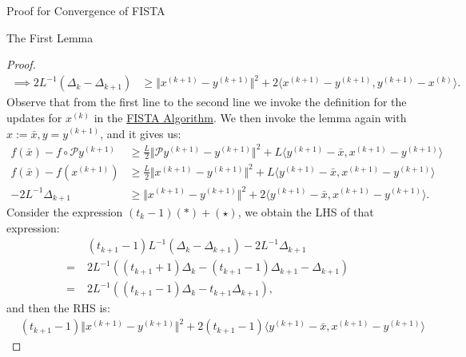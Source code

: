\documentclass[]{article}
\theoremstyle{definition}
\begin{document}
\begin{section}{Proof for Convergence of FISTA}
\begin{subsection}{The First Lemma}
\begin{proof}
\begin{align*}
                \implies
                2L^{-1} (\Delta_k - \Delta_{k + 1}) 
                & \ge 
                \Vert x^{(k + 1)} - y^{(k + 1)}\Vert^2 + 
                2\langle x^{(k + 1)} - y^{(k + 1)}, y^{(k + 1)} - x^{(k)}\rangle. 
                \tag{$*$}
            \end{align*}
            Observe that from the first line to the second line we invoke the definition for the updates for $x^{(k)}$ in the \hyperref[alg:fista_1]{FISTA Algorithm}. We then invoke the lemma again with $x:= \bar x, y = y^{(k + 1)}$, and it gives us: 
            \begin{align*}
                f(\bar x) - f\circ \mathcal P y^{(k + 1)}
                & \ge 
                \frac{L}{2}\Vert \mathcal P y^{(k + 1)} - y^{(k + 1)}\Vert^2 
                + L 
                \langle y^{(k + 1)} - \bar x, x^{(k + 1)} - y^{(k + 1)}\rangle
                \\
                f(\bar x) - f(x^{(k + 1)}) 
                &\ge 
                \frac{L}{2}\Vert x^{(k + 1)} - y^{(k + 1)}\Vert^2
                + 
                L \langle y^{(k + 1)} - \bar x, x^{(k + 1)} - y^{(k + 1)}\rangle
                \\
                -2L^{-1}\Delta_{k + 1}
                & \ge
                \Vert x^{(k + 1)} - y^{(k + 1)}\Vert^2
                + 
                2\langle y^{(k + 1)} - \bar x, x^{(k + 1)} - y^{(k + 1)}\rangle. 
                \tag{$\star$}
            \end{align*}
            Consider the expression $(t_k - 1)(*) + (\star)$, we obtain the LHS of that expression: 
            \begin{align*}
                &(t_{k + 1} - 1)L^{-1} (\Delta_k - \Delta_{k + 1}) 
                -
                2L^{-1}\Delta_{k + 1}
                \\
                = \; &
                2L^{-1}
                ((t_{k + 1} + 1)\Delta_k - (t_{k + 1} - 1)\Delta_{k + 1} - \Delta_{k + 1})
                \\
                = \; &
                2L^{-1}((t_{k + 1} - 1)\Delta_k - t_{k + 1}\Delta_{k + 1}),
                \tag{$\star *$LHS}
            \end{align*}
            and then the RHS is: 
            \begin{align*}
                & (t_{k + 1} - 1)\Vert x^{(k + 1)} - y^{(k + 1)}\Vert^2
                + 
                2(t_{k + 1} - 1)\langle y^{(k + 1)} - \bar x, x^{(k + 1)} - y^{(k + 1)}\rangle 

\end{align*}
\end{proof}
\end{subsection}
\end{section}
\end{document}
